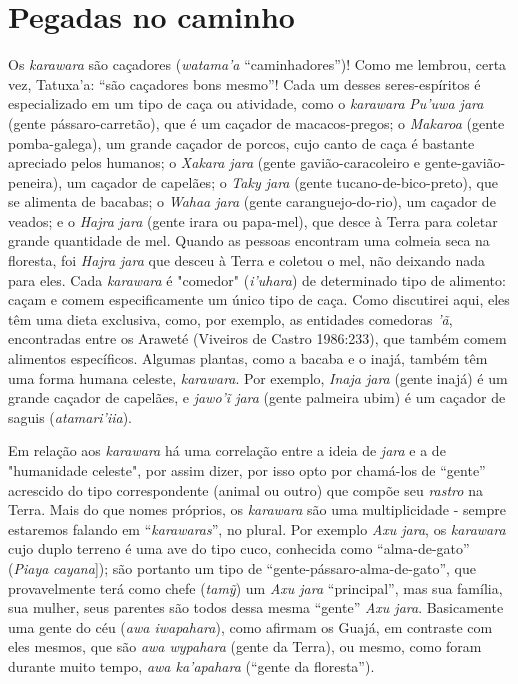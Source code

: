 \section{Pegadas no caminho}\label{pegadas-no-caminho}

Os \emph{karawara} são caçadores (\emph{watama'a} ``caminhadores'')!
Como me lembrou, certa vez, Tatuxa'a: ``são caçadores bons mesmo''! Cada
um desses seres-espíritos é especializado em um tipo de caça ou
atividade, como o \emph{karawara} \emph{Pu'uwa jara} (gente
pássaro-carretão), que é um caçador de macacos-pregos; o \emph{Makaroa}
(gente pomba-galega), um grande caçador de porcos, cujo canto de caça é
bastante apreciado pelos humanos; o \emph{Xakara jara} (gente
gavião-caracoleiro e gente-gavião-peneira), um caçador de capelães; o
\emph{Taky jara} (gente tucano-de-bico-preto), que se alimenta de
bacabas; o \emph{Wahaa jara} (gente caranguejo-do-rio), um caçador de
veados; e o \emph{Hajra} \emph{jara} (gente irara ou papa-mel), que
desce à Terra para coletar grande quantidade de mel. Quando as pessoas
encontram uma colmeia seca na floresta, foi \emph{Hajra jara} que desceu
à Terra e coletou o mel, não deixando nada para eles. Cada
\emph{karawara} é "comedor" (\emph{i'uhara}) de determinado tipo de
alimento: caçam e comem especificamente um único tipo de caça. Como
discutirei aqui, eles têm uma dieta exclusiva, como, por exemplo, as
entidades comedoras \emph{'ã}, encontradas entre os Araweté (Viveiros de
Castro 1986:233), que também comem alimentos específicos. Algumas
plantas, como a bacaba e o inajá, também têm uma forma humana celeste,
\emph{karawara}. Por exemplo, \emph{Inaja jara} (gente inajá) é um
grande caçador de capelães, e \emph{jawo'ĩ jara} (gente palmeira ubim) é
um caçador de saguis (\emph{atamari'iia}).

Em relação aos \emph{karawara} há uma correlação entre a ideia de
\emph{jara} e a de "humanidade celeste", por assim dizer, por isso opto
por chamá-los de ``gente'' acrescido do tipo correspondente (animal ou
outro) que compõe seu \emph{rastro} na Terra. Mais do que nomes
próprios, os \emph{karawara} são uma multiplicidade - sempre estaremos
falando em ``\emph{karawaras}'', no plural. Por exemplo \emph{Axu jara},
os \emph{karawara} cujo duplo terreno é uma ave do tipo cuco, conhecida
como ``alma-de-gato'' (\emph{Piaya} \emph{cayana}{]}); são portanto um
tipo de ``gente-pássaro-alma-de-gato'', que provavelmente terá como
chefe (\emph{tamỹ}) um \emph{Axu jara} ``principal'', mas sua família,
sua mulher, seus parentes são todos dessa mesma ``gente'' \emph{Axu
jara}. Basicamente uma gente do céu (\emph{awa iwapahara}), como afirmam
os Guajá, em contraste com eles mesmos, que são \emph{awa wypahara}
(gente da Terra), ou mesmo, como foram durante muito tempo, \emph{awa
ka'apahara} (``gente da floresta'').


